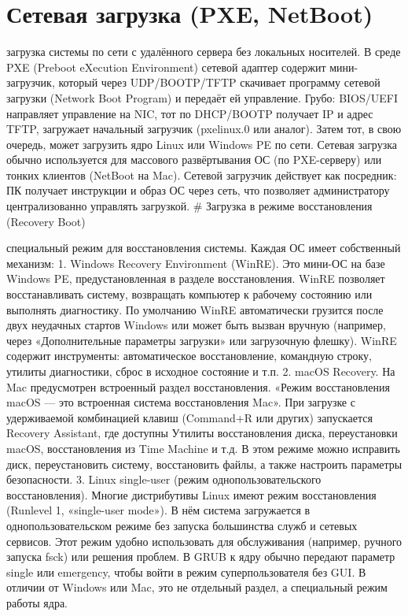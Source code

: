 \hypertarget{ux441ux435ux442ux435ux432ux430ux44f-ux437ux430ux433ux440ux443ux437ux43aux430-pxe-netboot}{%
\chapter{Сетевая загрузка (PXE,
NetBoot)}\label{ux441ux435ux442ux435ux432ux430ux44f-ux437ux430ux433ux440ux443ux437ux43aux430-pxe-netboot}}

загрузка системы по сети с удалённого сервера без локальных носителей. В
среде PXE (Preboot eXecution Environment) сетевой адаптер содержит
мини-загрузчик, который через UDP/BOOTP/TFTP скачивает программу сетевой
загрузки (Network Boot Program) и передаёт ей управление. Грубо:
BIOS/UEFI направляет управление на NIC, тот по DHCP/BOOTP получает IP и
адрес TFTP, загружает начальный загрузчик (pxelinux.0 или аналог). Затем
тот, в свою очередь, может загрузить ядро Linux или Windows PE по сети.
Сетевая загрузка обычно используется для массового развёртывания ОС (по
PXE-серверу) или тонких клиентов (NetBoot на Mac). Сетевой загрузчик
действует как посредник: ПК получает инструкции и образ ОС через сеть,
что позволяет администратору централизованно управлять загрузкой. \#
Загрузка в режиме восстановления (Recovery Boot)

специальный режим для восстановления системы. Каждая ОС имеет
собственный механизм: 1. Windows Recovery Environment (WinRE). Это
мини-ОС на базе Windows PE, предустановленная в разделе восстановления.
WinRE позволяет восстанавливать систему, возвращать компьютер к рабочему
состоянию или выполнять диагностику. По умолчанию WinRE автоматически
грузится после двух неудачных стартов Windows или может быть вызван
вручную (например, через «Дополнительные параметры загрузки» или
загрузочную флешку). WinRE содержит инструменты: автоматическое
восстановление, командную строку, утилиты диагностики, сброс в исходное
состояние и т.п. 2. macOS Recovery. На Mac предусмотрен встроенный
раздел восстановления. «Режим восстановления macOS --- это встроенная
система восстановления Mac». При загрузке с удерживаемой комбинацией
клавиш (Command+R или других) запускается Recovery Assistant, где
доступны Утилиты восстановления диска, переустановки macOS,
восстановления из Time Machine и т.д. В этом режиме можно исправить
диск, переустановить систему, восстановить файлы, а также настроить
параметры безопасности. 3. Linux single-user (режим
однопользовательского восстановления). Многие дистрибутивы Linux имеют
режим восстановления (Runlevel 1, «single-user mode»). В нём система
загружается в однопользовательском режиме без запуска большинства служб
и сетевых сервисов. Этот режим удобно использовать для обслуживания
(например, ручного запуска fsck) или решения проблем. В GRUB к ядру
обычно передают параметр single или emergency, чтобы войти в режим
суперпользователя без GUI. В отличии от Windows или Mac, это не
отдельный раздел, а специальный режим работы ядра.


